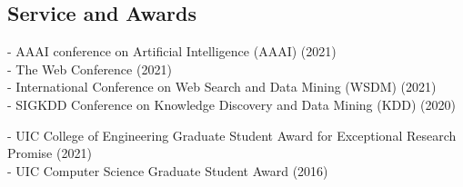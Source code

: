 \documentclass[mm]{simple_style}
\begin{document}
\begin{resume}
\vspace{-2ex}


\sectionline

\section{Service and Awards}




- AAAI conference on Artificial Intelligence (AAAI) (2021)
\\
- The Web Conference (2021)
\\
- International Conference on Web Search and Data Mining (WSDM) (2021)
\\
- SIGKDD Conference on Knowledge Discovery and Data Mining (KDD) (2020)


- UIC College of Engineering Graduate Student Award for Exceptional Research Promise (2021)
\\
- UIC Computer Science Graduate Student Award (2016)


\end{resume}
\end{document}
